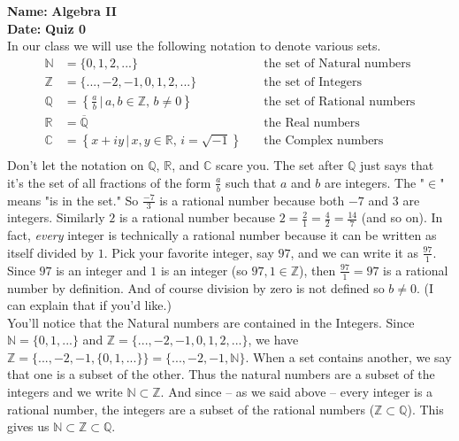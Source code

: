 \documentclass[11pt,letterpaper]{article}
\newcommand{\quiz}[2]{\noindent\textbf{Name: }\makebox[8cm]{\hrulefill} \hfill \textbf{Algebra II} \\  \textbf{Date: } \hfill \textbf{Quiz #2}\\}
\newcommand{\prob}{\noindent\textbf{Problem. }}
\newcounter{problem}
\newcommand{\pspace}{\par\vspace{\baselineskip}}
\begin{document}
\quiz{\#}{0}


\noindent In our class we will use the following notation to denote various sets.
\begin{align*}
\mathbb{N} &= \{0,1,2,...\}  \quad &\textrm{the set of Natural numbers} \\
\mathbb{Z} &= \{...,-2,-1,0,1,2,...\}  \quad &\textrm{the set of Integers} \\
\mathbb{Q} &= \left\{\frac{a}{b} \, | \, a,b\in \mathbb{Z}, \, b \ne 0 \right\}  \quad &\textrm{the set of Rational numbers} \\
\mathbb{R} &= \overline{\mathbb{Q}} \quad &\textrm{the Real numbers} \\
\mathbb{C} &= \left\{x + iy \, | \, x,y\in \mathbb{R}, \, i = \sqrt{-1}\right\}  \quad &\textrm{the Complex numbers} \\
\end{align*}
\noindent Don't let the notation on $\mathbb{Q}$, $\mathbb{R}$, and $\mathbb{C}$ scare you. The set after $\mathbb{Q}$ just says that it's the set of all fractions of the form $\frac{a}{b}$ such that $a$ and $b$ are integers. The "$\in$" means "is in the set." So $\frac{-7}{3}$ is a rational number because both $-7$ and $3$ are integers. Similarly $2$ is a rational number because $2 = \frac{2}{1} = \frac{4}{2} = \frac{14}{7}$ (and so on). In fact, \textit{every} integer is technically a rational number because it can be written as itself divided by $1$. Pick your favorite integer, say $97$, and we can write it as $\frac{97}{1}$. Since $97$ is an integer and $1$ is an integer (so $97, 1 \in \mathbb{Z}$), then $\frac{97}{1} = 97$ is a rational number by definition. And of course division by zero is not defined so $b \ne 0$. (I can explain that if you'd like.) \\

\noindent You'll notice that the Natural numbers are contained in the Integers. Since $\mathbb{N} = \{0,1,...\}$ and $\mathbb{Z} = \{...,-2,-1,0,1,2,...\}$, we have $\mathbb{Z} = \{...,-2, -1, \{0,1,...\}\} = \{...,-2,-1, \mathbb{N}\}$. When a set contains another, we say that one is a subset of the other. Thus the natural numbers are a subset of the integers and we write $\mathbb{N} \subset \mathbb{Z}$. And since -- as we said above -- every integer is a rational number, the integers are a subset of the rational numbers ($\mathbb{Z} \subset \mathbb{Q}$). This gives us $\mathbb{N} \subset \mathbb{Z} \subset \mathbb{Q}$. \\
\end{document}

